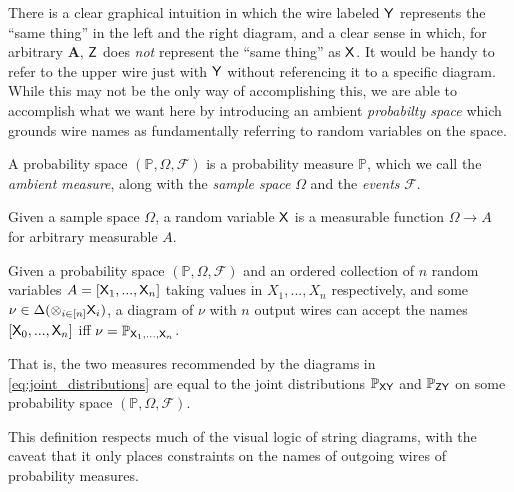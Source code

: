 There is a clear graphical intuition in which the wire labeled $\mathsf{Y}$ represents the ``same thing'' in the left and the right diagram, and a clear sense in which, for arbitrary $\mathbf{A}$, $\mathsf{Z}$ does \emph{not} represent the ``same thing'' as $\mathsf{X}$. It would be handy to refer to the upper wire just with $\mathsf{Y}$ without referencing it to a specific diagram. While this may not be the only way of accomplishing this, we are able to accomplish what we want here by introducing an ambient \emph{probabilty space} which grounds wire names as fundamentally referring to random variables on the space.

\begin{definition}
A probability space $(\mathbb{P},\Omega,\mathcal{F})$ is a probability measure $\mathbb{P}$, which we call the \emph{ambient measure}, along with the \emph{sample space} $\Omega$ and the \emph{events} $\mathcal{F}$.
\end{definition}

\begin{definition}
Given a sample space $\Omega$, a random variable $\mathsf{X}$ is a measurable function $\Omega\to A$ for arbitrary measurable $A$.
\end{definition}

\begin{definition}\label{def:wire_names_as_RVs}
Given a probability space $(\mathbb{P},\Omega,\mathcal{F})$ and an ordered collection of $n$ random variables $A=[\mathsf{X}_1,...,\mathsf{X}_n]$ taking values in $X_1,...,X_n$ respectively, and some $\nu\in \Delta(\otimes_{i\in[n]} \mathsf{X}_i)$, a diagram of $\nu$ with $n$ output wires can accept the names $[\mathsf{X}_0,...,\mathsf{X}_n]$ iff $\nu = \mathbb{P}_{\mathsf{X}_1,...,\mathsf{X}_n}$. 
\end{definition}

That is, the two measures recommended by the diagrams in \ref{eq:joint_distributions} are equal to the joint distributions $\mathbb{P}_{\mathsf{X}\mathsf{Y}}$ and $\mathbb{P}_{\mathsf{Z}\mathsf{Y}}$ on some probability space $(\mathbb{P},\Omega,\mathcal{F})$.

This definition respects much of the visual logic of string diagrams, with the caveat that it only places constraints on the names of outgoing wires of probability measures.

